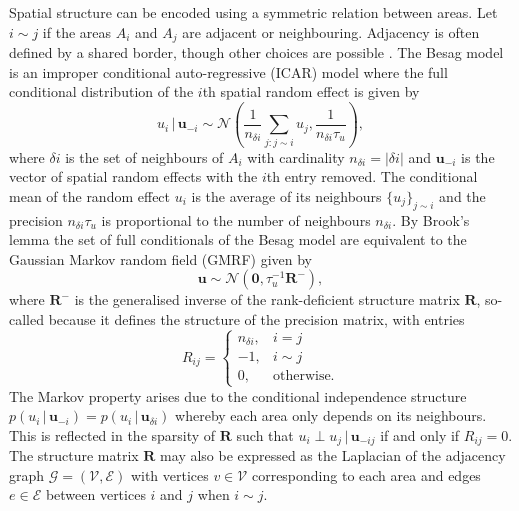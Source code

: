 \documentclass[a4paper, nobind]{templates/ociamthesis}
\begin{document}
Spatial structure can be encoded using a symmetric relation between areas.
Let \(i \sim j\) if the areas \(A_i\) and \(A_j\) are adjacent or neighbouring.
Adjacency is often defined by a shared border, though other choices are possible \autocite{paciorek2013spatial}.
The Besag model \autocite{besag1991bayesian} is an improper conditional auto-regressive (ICAR) model where the full conditional distribution of the \(i\)th spatial random effect is given by
\begin{equation}
    u_i \, | \, \mathbf{u}_{-i} \sim \mathcal{N} \left(\frac{1}{n_{\delta i}} \sum_{j: j \sim i} u_j, \frac{1}{n_{\delta i}\tau_u}\right), \label{eq:besag}
\end{equation}
where \(\delta i\) is the set of neighbours of \(A_i\) with cardinality \(n_{\delta i} = |\delta i|\) and \(\mathbf{u}_{-i}\) is the vector of spatial random effects with the \(i\)th entry removed.
The conditional mean of the random effect \(u_i\) is the average of its neighbours \(\{u_j\}_{j \sim i}\) and the precision \(n_{\delta i}\tau_u\) is proportional to the number of neighbours \(n_{\delta i}\).
By Brook's lemma \autocite{rue2005gaussian} the set of full conditionals of the Besag model are equivalent to the Gaussian Markov random field (GMRF) given by
\begin{equation}
    \mathbf{u} \sim \mathcal{N}(\mathbf{0}, \tau_u^{-1} \mathbf{R}^{-}), \label{eq:gmrf}
\end{equation}
where \(\mathbf{R}^{-}\) is the generalised inverse of the rank-deficient structure matrix \(\mathbf{R}\), so-called because it defines the structure of the precision matrix, with entries
\begin{equation}
    R_{ij} =
    \begin{cases}
        n_{\delta i}, & i = j \\
        -1, & i \sim j \\
        0, & \text{otherwise.}
    \end{cases}
\end{equation}
The Markov property arises due to the conditional independence structure \(p(u_i \, | \, \mathbf{u}_{-i}) = p(u_i \, | \, \mathbf{u}_{\delta i})\) whereby each area only depends on its neighbours.
This is reflected in the sparsity of \(\mathbf{R}\) such that \(u_i \perp u_j \, | \, \mathbf{u}_{-ij}\) if and only if \(R_{ij} = 0\).
The structure matrix \(\mathbf{R}\) may also be expressed as the Laplacian of the adjacency graph \(\mathcal{G} = (\mathcal{V}, \mathcal{E})\) with vertices \(v \in \mathcal{V}\) corresponding to each area and edges \(e \in \mathcal{E}\) between vertices \(i\) and \(j\) when \(i \sim j\).
\end{document}
